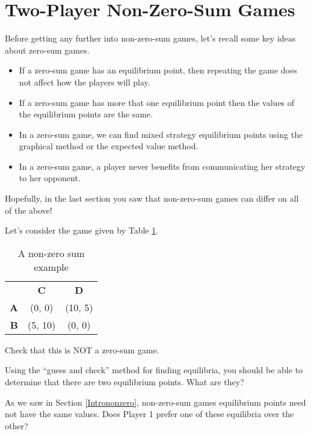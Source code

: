 
\section{Two-Player Non-Zero-Sum Games}\label{pdandchicken}

Before getting any further into non-zero-sum games, let's recall some key ideas about zero-sum games. 
\begin{itemize}
\item If a zero-sum game has an equilibrium point, then repeating the game does not affect how the players will play. 
\item If a zero-sum game has more that one equilibrium point then the values of the equilibrium points are the same.
\item In a zero-sum game, we can find mixed strategy equilibrium points using the graphical method or the expected value method.
\item In a zero-sum game, a player never benefits from communicating her strategy to her opponent.
\end{itemize}

Hopefully, in the last section you saw that non-zero-sum games can differ on all of the above!

\begin{example}\label{E:simplenonzero}
Let's  consider the game given by Table \ref{T:simplenonzero}.
\begin{table}[h]
\centering
\begin{tabular}{rcc}
&\textbf{C}&\textbf{D}\\ 
\textbf{A} &(0, 0)&(10, 5) \\ 
\textbf{B}&(5, 10)&(0, 0) \\ 
\end{tabular}
\caption{A non-zero sum example}
\label{T:simplenonzero}
\end{table}
\end{example}

\begin{xca}\label{E:simplenzero}
Check that this is NOT a zero-sum game. 
\end{xca}

\begin{xca}\label{E:simplefindequil}
Using the ``guess and check'' method for finding equilibria, you should be able to determine that there are two equilibrium points. What are they? 
\end{xca}

\begin{xca}\label{E:simpleprefer}
As we saw in Section \ref{Intrononzero}, non-zero-sum games equilibrium points need not have the same values. Does Player 1 prefer one of these equilibria over the other?
\end{xca}

